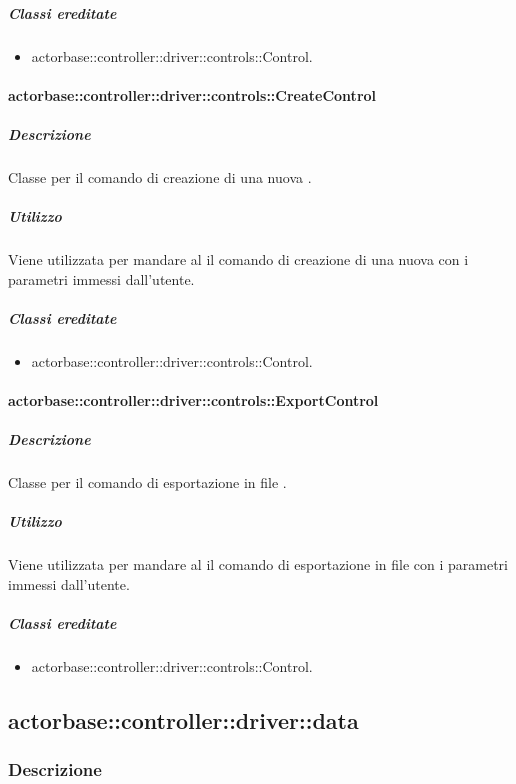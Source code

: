 \documentclass{scalatekids-article}
\begin{document}
\subparagraph{Classi ereditate}

\begin{itemize}
\item actorbase::controller::driver::controls::Control.
\end{itemize}

\paragraph{actorbase::controller::driver::controls::CreateControl}

\subparagraph{Descrizione}

Classe per il comando di creazione di una nuova .

\subparagraph{Utilizzo}

Viene utilizzata per mandare al  il comando di creazione di una
nuova  con i parametri immessi dall'utente.

\subparagraph{Classi ereditate}

\begin{itemize}
\item actorbase::controller::driver::controls::Control.
\end{itemize}

\paragraph{actorbase::controller::driver::controls::ExportControl}

\subparagraph{Descrizione}

Classe per il comando di esportazione in file .

\subparagraph{Utilizzo}

Viene utilizzata per mandare al  il comando di esportazione in
file  con i parametri immessi dall'utente.

\subparagraph{Classi ereditate}

\begin{itemize}
\item actorbase::controller::driver::controls::Control.
\end{itemize}

\subsection{actorbase::controller::driver::data}

\subsubsection{Descrizione}
\end{document}
